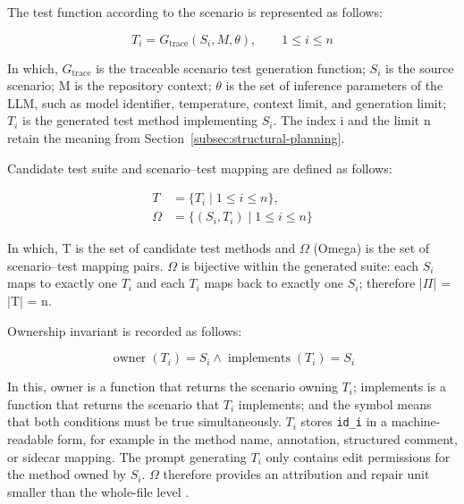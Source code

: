 \documentclass[pdflatex,sn-basic,Numbered,iicol]{sn-jnl}
\begin{document}
The test function according to the scenario is represented as follows:

\begin{equation}
T_i = G_{\mathrm{trace}}(S_i,M,\theta), \qquad 1 \leq i \leq n
\label{eq:trace-generation}
\end{equation}

In which, $G_{\mathrm{trace}}$ is the traceable scenario test generation function; $S_i$ is the source scenario; M is the repository context; \ensuremath{\theta} is the set of inference parameters of the LLM, such as model identifier, temperature, context limit, and generation limit; $T_i$ is the generated test method implementing $S_i$. The index i and the limit n retain the meaning from Section~\ref{subsec:structural-planning}.

Candidate test suite and scenario--test mapping are defined as follows:

\begin{equation}
\begin{aligned}
T &= \{T_i \mid 1 \leq i \leq n\},\\
\Omega &= \{(S_i,T_i) \mid 1 \leq i \leq n\}
\end{aligned}
\label{eq:scenario-test-mapping}
\end{equation}

In which, T is the set of candidate test methods and \ensuremath{\Omega} (Omega) is the set of scenario--test mapping pairs. \ensuremath{\Omega} is bijective within the generated suite: each $S_i$ maps to exactly one $T_i$ and each $T_i$ maps back to exactly one $S_i$; therefore |\ensuremath{\Pi}| = |T| = n.

Ownership invariant is recorded as follows:

\begin{equation}
\operatorname{owner}(T_i)=S_i \land \operatorname{implements}(T_i)=S_i
\label{eq:ownership-invariant}
\end{equation}

In this, owner is a function that returns the scenario owning $T_i$; implements is a function that returns the scenario that $T_i$ implements; and the symbol means that both conditions must be true simultaneously. $T_i$ stores \texttt{id\_i} in a machine-readable form, for example in the method name, annotation, structured comment, or sidecar mapping. The prompt generating $T_i$ only contains edit permissions for the method owned by $S_i$. \ensuremath{\Omega} therefore provides an attribution and repair unit smaller than the whole-file level \cite{bib26,bib4,bib27,bib28}.
\end{document}
